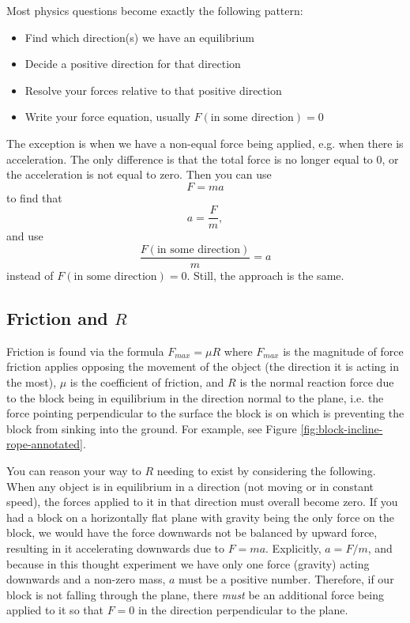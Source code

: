Most physics questions become exactly the following pattern:
\begin{itemize}
    \item Find which direction(s) we have an equilibrium
    \item Decide a positive direction for that direction
    \item Resolve your forces relative to that positive direction
    \item Write your force equation, usually $F(\text{in some direction}) = 0$
\end{itemize}


The exception is when we have a non-equal force being applied, e.g. when there is acceleration. The only difference is that the total force is no longer equal to $0$, or the acceleration is not equal to zero. Then you can use
\[
F = ma
\]
to find that
\[
a = \frac{F}{m},
\]
and use
\[
\frac{F(\text{in some direction})}{m} = a
\]
instead of $F(\text{in some direction}) = 0$. Still, the approach is the same.

\subsection{Friction and $R$}
Friction is found via the formula $F_{max} = \mu R$ where $F_{max}$ is the magnitude of force friction applies opposing the movement of the object
(the direction it is acting in the most), 
$\mu$ is the coefficient of friction, and $R$ is the normal reaction force due to the block being in equilibrium in the direction normal to the plane, 
i.e. the force pointing perpendicular to the surface the block is on which is preventing the block from sinking into the ground. For example, see Figure \ref{fig:block-incline-rope-annotated}.

You can reason your way to $R$ needing to exist by considering the following. When any object is in equilibrium in a direction (not moving or in constant speed), the forces applied to it 
in that direction must overall become zero. If you had a block on a horizontally flat plane with gravity being the only force on the block, we would have the force downwards 
not be balanced by upward force, resulting in it accelerating downwards due to $F = ma$. Explicitly, $a = F/m$, and because in this thought experiment we have only one force (gravity) acting downwards 
and a non-zero mass, $a$ must be a positive number. Therefore, if our block is not falling through the plane, there \emph{must} be an additional force being applied to it so that $F = 0$ in the direction 
perpendicular to the plane.

